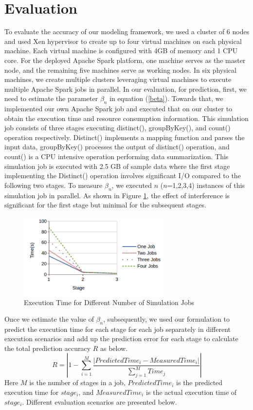 \section{Evaluation}
\label{evaluation}
\noindent
To evaluate the accuracy of our modeling framework, we used a cluster of 6 nodes and used Xen hypervisor \cite{xen} to create up to four virtual machines on each physical machine. Each virtual machine is configured with 4GB of memory and 1 CPU core. For the deployed Apache Spark platform, one machine serves as the master node, and the remaining five machines serve as working nodes. In six physical machines, we create multiple clusters leveraging virtual machines to execute multiple Apache Spark jobs in parallel. 
\noindent
In our evaluation, for prediction, first, we need to estimate the parameter $\beta_{n}$ in equation (\ref{beta}). Towards that, we implemented our own Apache Spark job and executed that on our cluster to obtain the execution time and resource consumption information. This simulation job consists of three stages executing distinct(), groupByKey(), and count() operation respectively. Distinct() implements a mapping function and parses the input data, groupByKey() processes the output of distinct() operation, and count() is a CPU intensive operation performing data summarization. This simulation job is executed with 2.5 GB of sample data where the first stage implementing the Distinct() operation involves significant I/O compared to the following two stages. To measure $\beta_{n}$, we executed $n$ ($n$=1,2,3,4) instances of this simulation job in parallel. As shown in Figure \ref{simjobs}, the effect of interference is significant for the first stage but minimal for the subsequent stages. 
\begin{figure}[!t]
\centering
\captionsetup{justification=centering}
\includegraphics[width=3in]{figures/simjobs.png}
\caption{Execution Time for Different Number of Simulation Jobs}
\label{simjobs}
\end{figure}
\noindent
Once we estimate the value of $\beta_{n}$, subsequently, we used our formulation to predict the execution time for each stage for each job separately in different execution scenarios and add up the prediction error for each stage to calculate the total prediction accuracy $R$ as below.
\begin{equation}
\label{predictaccuracy}
R = |1 - \sum_{i=1}^{M} \frac{|PredictedTime_i - MeasuredTime_i|}{\sum_{j=1}^{M} Time_{j}}|
\end{equation}
\noindent
Here $M$ is the number of stages in a job, $PredictedTime_i$ is the predicted execution time for $stage_i$, and $MeasuredTime_i$ is the actual execution time of $stage_i$. Different evaluation scenarios are presented below.



